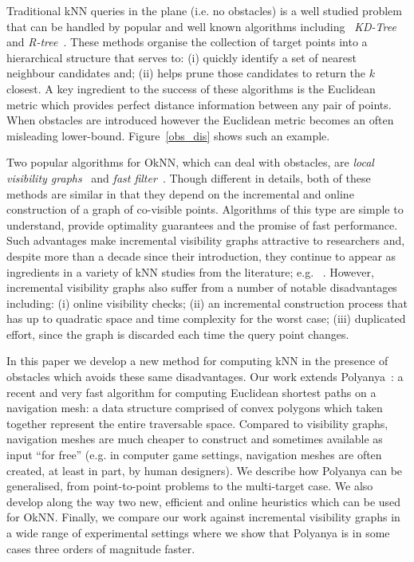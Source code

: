 Traditional kNN queries in the plane (i.e. no obstacles) is a well studied
problem that can be handled by popular and well known algorithms including
~\textit{KD-Tree}~\cite{ooi1987spatial} and
\textit{R-tree}~\cite{guttman1984r}.  
These methods organise the collection of target points into a hierarchical structure 
that serves to: (i) quickly identify a set of nearest neighbour candidates and; (ii) helps 
prune those candidates to return the $k$ closest.  A key ingredient to the success of
these algorithms is the Euclidean metric which provides perfect
distance information between any pair of points.  When obstacles are
introduced however the Euclidean metric becomes an often misleading
lower-bound. Figure~\ref{obs_dis} shows such an example.

Two popular algorithms for OkNN, which can deal with obstacles, are
\emph{local visibility graphs}~\cite{zhang2004spatial} and \emph{fast
filter}~\cite{xia2004fast}. Though different in details, both of these methods
are similar in that they depend on the incremental and online construction of 
a graph of co-visible points. Algorithms of this type are simple to understand, 
provide optimality guarantees and the promise of fast performance. 
Such advantages make incremental visibility graphs attractive to researchers 
and, despite more than a decade since their introduction, they continue to 
appear as ingredients in a variety of kNN studies from the literature; e.g. 
~\cite{gao2011efficient,gao2016reverse,gao2009continuous}.
However, incremental visibility graphs also suffer from a number of notable 
disadvantages including:
(i) online visibility checks;
(ii) an incremental construction process that has up to quadratic space and 
time complexity for the worst case;
(iii) duplicated effort, since the graph is discarded each time the query 
point changes.

In this paper we develop a new method for computing kNN in the presence of
obstacles which avoids these same disadvantages.  Our work extends
Polyanya~\cite{cuicompromise}: a recent and very fast algorithm for computing
Euclidean shortest paths on a navigation mesh: a data structure comprised of
convex polygons which taken together represent the entire traversable space.  
Compared to visibility graphs, navigation meshes are much cheaper to construct and
sometimes available as input ``for free'' (e.g. in computer game settings, navigation
meshes are often created, at least in part, by human designers).  
We describe how Polyanya can be generalised, from point-to-point problems to the
multi-target case. We also develop along the way two new, efficient and online heuristics
which can be used for OkNN.  Finally, we compare our work against incremental
visibility graphs in a wide range of experimental settings where we show that
Polyanya is in some cases three orders of magnitude faster.

